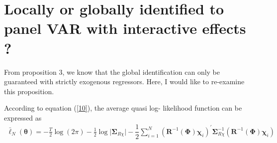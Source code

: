 \documentclass[12pt,a4paper,hyperref]{article}
\begin{document}
\appendix
\appendixpage

\section{Locally or globally identified to panel VAR with interactive effects ?}
From \citet{Hayakawa:2018} proposition 3, we know that the global identification can only be guaranteed with strictly exogenous regressors. Here, I would like to re-examine this proposition.


According to equation  (\ref{10}), the average quasi log- likelihood function can be expressed as
\begin{align}
\bar{\ell}_{N} (\boldsymbol{\theta})=-\frac{T}{2} \log (2\pi)-\frac{1}{2} \log \vert  \boldsymbol{\Sigma}_{R \chi} \vert-\dfrac{1}{2}\sum^{N}_{i=1}\left( \boldsymbol{R}^{-1}(\boldsymbol{\Phi})\boldsymbol{\chi}_{i}\right)^{'}\boldsymbol{\Sigma}_{R \chi}^{-1}\left( \boldsymbol{R}^{-1}(\boldsymbol{\Phi}) \boldsymbol{\chi}_{i}\right) \label{A1}
\end{align}
\end{document}

